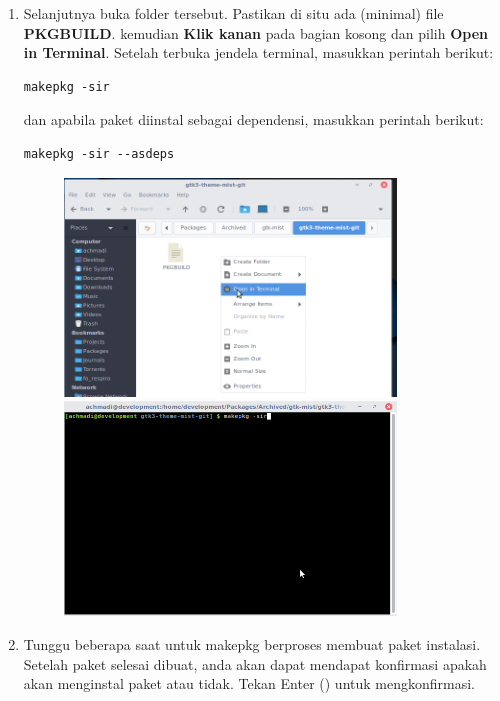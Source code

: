 \documentclass[12pt,]{article}
\begin{document}
\begin{enumerate}
		\item Selanjutnya buka folder tersebut.
		Pastikan di situ ada (minimal) file \textbf{PKGBUILD}.
		kemudian \textbf{Klik kanan} pada bagian kosong dan pilih \textbf{Open in Terminal}.
		Setelah terbuka jendela terminal, masukkan perintah berikut:
		
		\begin{verbatim}
makepkg -sir
		\end{verbatim} 
		
		dan apabila paket diinstal sebagai dependensi, masukkan perintah berikut:
		
		\begin{verbatim}
makepkg -sir --asdeps
		\end{verbatim}
		
		\begin{figure}[h]
			\centering
			\includegraphics[width=250pt]{aur/terminal}
			\includegraphics[width=250pt]{aur/makepkg}
		\end{figure} 
		
		\item Tunggu beberapa saat untuk makepkg berproses membuat paket instalasi.
		Setelah paket selesai dibuat, anda akan dapat mendapat konfirmasi apakah akan menginstal paket atau tidak.
		Tekan Enter (\keys{\return}) untuk mengkonfirmasi.	
		

\end{enumerate}
\end{document}
